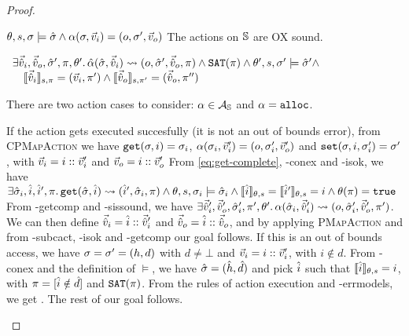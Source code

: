 \begin{proof}


\pfassume \begin{hypvlist}
 $\theta,s,\st\models\sst \land \ppexecc{\alpha}{\st,\ins}{o,\st',\outs}$
 The actions on $\mmdl$ are OX sound.
\end{hypvlist}
\pfprove \begin{goalvlist}
 $
\begin{array}{l}
\exists \sins,\souts,\sst',\pc,\theta'\ldotp \ppexec{\hat\alpha}{\sst,\sins}{o,\sst',\souts,\pc} \land \SAT(\pc) \land \theta',s,\st'\models \sst' \land\\
\quad \expeval[s,\pc]{\sins}=(\ins,\pc')\land\expeval[s,\pc']{\souts}=(\souts,\pc'')
\end{array}$
\end{goalvlist}

There are two action cases to consider: $\alpha\in\actions_\mmdl$ and $\alpha=\alloc$.

\pfcase{$\alpha\in\actions_\mmdl$}

\begin{hypvlist}
 If the action gets executed succesfully (it is not an out of bounds error), from \textsc{CPMapAction} we have $\ppgetc{\st,i}{\st_i}$,  $\ppexecc{\alpha}{\st_i,\ins'}{o,\st'_i,\outs'}$ and $\ppset{\st,i,\st'_i}{\st'}$, with $\ins=i::\ins'$ and $\outs=i::\outs'$
 From \ref{eq:get-complete}, \hyp{conex} and \hyp{isok}, we have $\exists \sst_i, \sym i, \sym i', \pc \ldotp \ppget{\sst,\sym i}{\sym i', \sst_i, \pc} \land \theta,s,\st_i\models\sst_i \land \expeval{\sym i}=\expeval{\sym i'}=i \land \theta(\pc)=\vtrue$
 From \hyp{getcomp} and \hyp{sissound}, we have $\exists \sins',\souts',\sst'_i,\pc',\theta'\ldotp \ppexec{\alpha}{\sst_i,\sins'}{o,\sst'_i,\souts',\pc'}$. 
 We can then define $\sins=\sym i::\sins'$ and $\souts=\sym i::\souts$, and by applying \textsc{PMapAction} and from \hyp{subcact}, \hyp{isok} and \hyp{getcomp} our goal  follows.
 If this is an out of bounds access, we have $\st=\st'=(h,d)$ with $d\neq\bot$ and $\ins=i::\ins'$, with $i\notin d$. 
 From \hyp{conex} and the definition of $\models$, we have $\sst=(\sym h, \sym d)$ and pick $\sym i$ such that $\expeval{\sym i}=i$, with $\pc=[\sym i\notin \sym d]$ and $\SAT(\pc)$. 
 From the rules of action execution and \hyp{errmodels}, we get . The rest of our goal  follows.
\end{hypvlist}


\end{proof}
